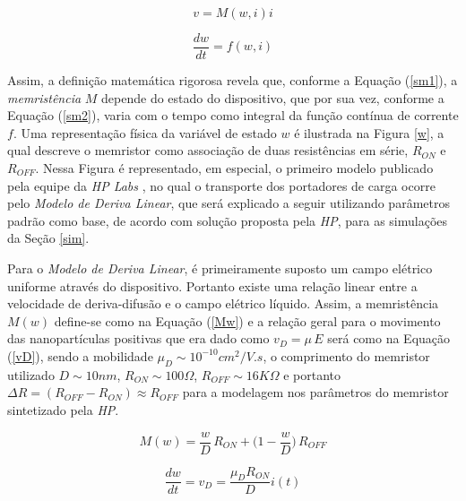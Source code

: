 \documentclass{ceel}
\begin{document}
\begin{multicols}{2}
\begin{equation}\label{sm1}
v=M(w, i)i
\end{equation}

\begin{equation}\label{sm2}
\dfrac{dw}{dt}=f(w, i)
\end{equation}
\vspace{0.01cm}

Assim, a definição matemática rigorosa revela que, conforme a Equação (\ref{sm1}), a \emph{memristência} $M$ depende do estado do dispositivo, que por sua vez, conforme a Equação (\ref{sm2}), varia com o tempo como integral da função contínua de corrente $f$. Uma representação física da variável de estado $w$ é ilustrada na Figura \ref{w}, a qual descreve o memristor como associação de duas resistências em série, $R_{ON}$ e $R_{OFF}$. Nessa Figura é representado, em especial, o primeiro modelo publicado pela equipe da \emph{HP Labs} \cite{nature}, no qual o transporte dos portadores de carga ocorre pelo \emph{Modelo de Deriva Linear}, que será explicado a seguir utilizando parâmetros padrão como base, de acordo com solução proposta pela \emph{HP}, para as simulações da Seção \ref{sim}.

Para o \emph{Modelo de Deriva Linear}, é primeiramente suposto um campo elétrico uniforme através do dispositivo. Portanto existe uma relação linear entre a velocidade de deriva-difusão e o campo elétrico líquido. Assim, a memristência $M(w)$ define-se como na Equação (\ref{Mw}) e a relação geral para o movimento das nanopartículas positivas que era dado como $v_D=\mu\, E$ será como na Equação (\ref{vD}), sendo a mobilidade $\mu_D \sim 10^{-10} cm^2/V.s$, o comprimento do memristor utilizado $D\sim10nm$, $R_{ON}\sim 100\Omega$, $R_{OFF}\sim 16K\Omega$ e portanto $\Delta R = (R_{OFF} - R_{ON}) \approx R_{OFF}$ para a modelagem nos parâmetros do memristor sintetizado pela \emph{HP}.

\vspace{0.05cm}
\begin{equation}\label{Mw}
M(w)=\dfrac{w}{D}\, R_{ON}+\Big(1 - \dfrac{w}{D}\Big)\, R_{OFF}
\end{equation}

\begin{equation}\label{vD}
\dfrac{dw}{dt}=v_D=\dfrac{\mu_D R_{ON}}{D}i(t)
\end{equation}
\vspace{0.05cm}


\end{multicols}
\end{document}
